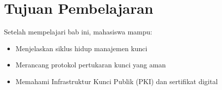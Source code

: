 \section*{Tujuan Pembelajaran}
Setelah mempelajari bab ini, mahasiswa mampu:
\begin{itemize}
\item Menjelaskan siklus hidup manajemen kunci
\item Merancang protokol pertukaran kunci yang aman
\item Memahami Infrastruktur Kunci Publik (PKI) dan sertifikat digital
\end{itemize}
